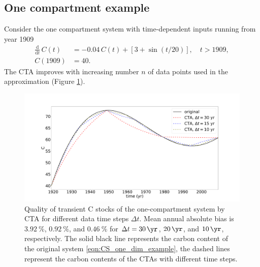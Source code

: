 \documentclass[11pt,a4paper]{article}
\newcommand{\deriv}[1]{\frac{\mathrm{d}}{\mathrm{d}#1}}
\begin{document}
\subsection{One compartment example}
Consider the one compartment system with time-dependent inputs running from year 1909
\begin{equation}\label{eqn:CS_one_dim_example}
    \begin{aligned}
        \deriv{t}\,C(t) &= -0.04\,C(t) + \left[3+\sin(t/20)\right],\quad t>1909,\\
        C(1909) &= 40.
    \end{aligned}
\end{equation}
 The CTA improves with increasing number $n$ of data points used in the approximation (Figure \ref{fig:CS_one_dim_example}).

\begin{figure}[htbp]
    \centering 
    \includegraphics[width=1.0\linewidth]{figs/interpol_pwc_1.pdf}
    \caption{Quality of transient C stocks of the one-compartment system by CTA for different data time steps $\Delta t$.
    Mean annual absolute bias is $\SI{3.92}{\percent}$, $\SI{0.92}{\percent}$, and $\SI{0.46}{\percent}$ for $\Delta{t} = \SI{30}{\yr}$, $\SI{20}{\yr}$, and $\SI{10}{\yr}$, respectively.
    The solid black line represents the carbon content of the original system \eqref{eqn:CS_one_dim_example}, the dashed lines represent the carbon contents of the CTAs with different time steps.
    }    
    \label{fig:CS_one_dim_example}
\end{figure}        
\end{document}
